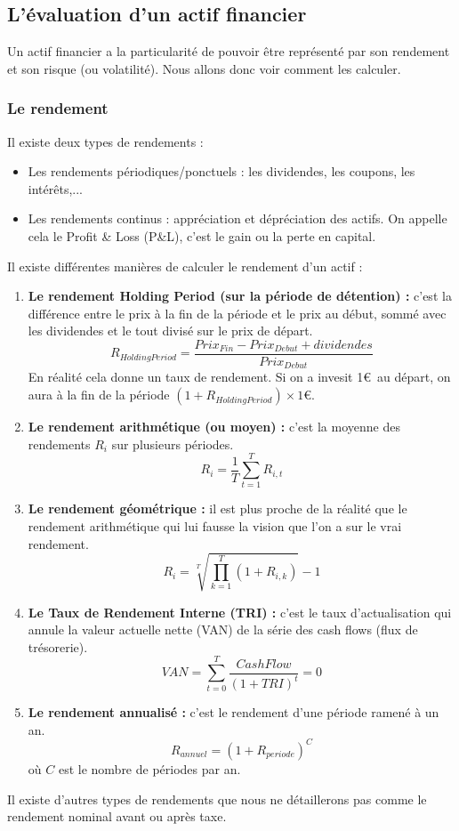 \subsection{L'évaluation d'un actif financier}
Un actif financier a la particularité de pouvoir être représenté par son rendement et son risque (ou volatilité). Nous allons donc voir comment les calculer.

\subsubsection{Le rendement}
Il existe deux types de rendements :
\begin{itemize}
 \item Les rendements périodiques/ponctuels : les dividendes, les coupons, les intérêts,...
 \item Les rendements continus : appréciation et dépréciation des actifs. On appelle cela le Profit \& Loss (P\&L), c'est le gain ou la perte en capital.
\end{itemize}

Il existe différentes manières de calculer le rendement d'un actif :
\begin{enumerate}
 \item \textbf{Le rendement Holding Period (sur la période de détention) :} c'est la différence entre le prix à la fin de la période et le prix au début, sommé avec les dividendes et le tout divisé sur le prix de départ.
 \[ R_{Holding Period} = \frac{Prix_{Fin}-Prix_{Debut}+dividendes}{Prix_{Debut}} \]
 En réalité cela donne un taux de rendement. Si on a invesit 1\euro\ au départ, on aura à la fin de la période \((1 + R_{Holding Period})\times 1\)\euro.
 \item \textbf{Le rendement arithmétique (ou moyen) :} c'est la moyenne des rendements $R_i$ sur plusieurs périodes.
 \[ R_{i} = \frac{1}{T} \sum_{t=1}^T R_{i,t}\]
 \item \textbf{Le rendement géométrique :} il est plus proche de la réalité que le rendement arithmétique qui lui fausse la vision que l'on a sur le vrai rendement.
 \[ R_{i} = \sqrt[T]{\prod_{k=1}^{T}(1+R_{i,k})}-1\]
 \item \textbf{Le Taux de Rendement Interne (TRI) :} c'est le taux d'actualisation qui annule la valeur actuelle nette (VAN) de la série des cash flows (flux de trésorerie).
 \[ VAN = \sum_{t=0}^{T} \frac{CashFlow}{(1+TRI)^t} = 0\]
 \item \textbf{Le rendement annualisé :} c'est le rendement d'une période ramené à un an.
 \[ R_{annuel} = (1+R_{periode})^C\]
 où $C$ est le nombre de périodes par an.
\end{enumerate}
Il existe d'autres types de rendements que nous ne détaillerons pas comme le rendement nominal avant ou après taxe.\\

